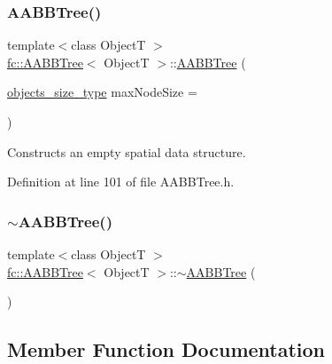 \subsubsection{\texorpdfstring{A\+A\+B\+B\+Tree()}{AABBTree()}}
{\footnotesize\ttfamily template$<$class ObjectT $>$ \\
\hyperlink{classfc_1_1AABBTree}{fc\+::\+A\+A\+B\+B\+Tree}$<$ ObjectT $>$\+::\hyperlink{classfc_1_1AABBTree}{A\+A\+B\+B\+Tree} (\begin{DoxyParamCaption}\item[{\hyperlink{classfc_1_1AABBTree_a3333c421c1fa34841043bd8545de8ea8}{objects\+\_\+size\+\_\+type}}]{max\+Node\+Size = {} }\end{DoxyParamCaption})\hspace{0.3cm}{\ttfamily [explicit]}}

Constructs an empty spatial data structure. 

Definition at line 101 of file A\+A\+B\+B\+Tree.\+h.

\mbox{\label{classfc_1_1AABBTree_a13dfddea7618153509ca07e14334cfe0}} 
\subsubsection{\texorpdfstring{$\sim$\+A\+A\+B\+B\+Tree()}{~AABBTree()}}
{\footnotesize\ttfamily template$<$class ObjectT $>$ \\
\hyperlink{classfc_1_1AABBTree}{fc\+::\+A\+A\+B\+B\+Tree}$<$ ObjectT $>$\+::$\sim$\hyperlink{classfc_1_1AABBTree}{A\+A\+B\+B\+Tree} (\begin{DoxyParamCaption}{ }\end{DoxyParamCaption})\hspace{0.3cm}{\ttfamily [default]}}



\subsection{Member Function Documentation}
\mbox{\label{classfc_1_1AABBTree_aac657a296e6a26e675a259c5d3fef53d}} 
